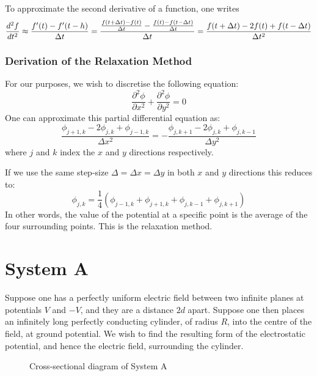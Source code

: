 \documentclass[12pt, a4paper]{article}
\newcommand{\be}{\begin{equation}}
\newcommand{\ee}{\end{equation}}
\begin{document}
To approximate the second derivative of a function, one writes
%
\be
\frac{d^2 f}{dt^2} \approx \frac{f'(t) - f'(t-h)}{\Delta t} \\
= \frac{\frac{f(t +\Delta t) - f(t)}{\Delta t} - \frac{f(t) - f(t -\Delta t)}{\Delta t}}{\Delta t} \\
= \frac{f(t +\Delta t) - 2f(t) + f(t-\Delta t)}{\Delta t ^2}
\ee

\subsubsection{Derivation of the Relaxation Method}

For our purposes, we wish to discretise the following equation:
%
\be
\frac{\partial^2 \phi}{\partial x^2}+\frac{\partial^2 \phi}{\partial y^2} = 0
\ee
%
One can approximate this partial differential equation as:
%
\be
\frac{\phi_{j+1,k}-2\phi_{j,k}+\phi_{j-1,k}}{\Delta x^2} = - \frac{\phi_{j,k+1}-2\phi_{j,k}+\phi_{j,k-1}}{\Delta y^2}
\ee
%
where $j$ and $k$ index the $x$ and $y$ directions respectively.

If we use the same step-size $\Delta=\Delta x=\Delta y$ in both $x$ and $y$ directions this
reduces to:
%
\be
\phi_{j,k}= \frac{1}{4}(\phi_{j-1,k}+\phi_{j+1,k}+\phi_{j,k-1}+\phi_{j,k+1})
\ee
%
In other words, the value of the potential at a specific point is the average of
the four surrounding points. This is the relaxation method.

\section{System A}

Suppose one has a perfectly uniform electric field between two infinite planes
at potentials $V$ and $-V$, and they are a distance $2d$ apart. Suppose one then
places an infinitely long perfectly conducting cylinder, of radius $R$, into the centre
of the field, at ground potential. We wish to find the resulting form of the
electrostatic potential, and hence the electric field, surrounding the cylinder.

\begin{figure}[h!]
\begin{center}
\end{center}
\caption{Cross-sectional diagram of System A}
\end{figure}
\end{document}
